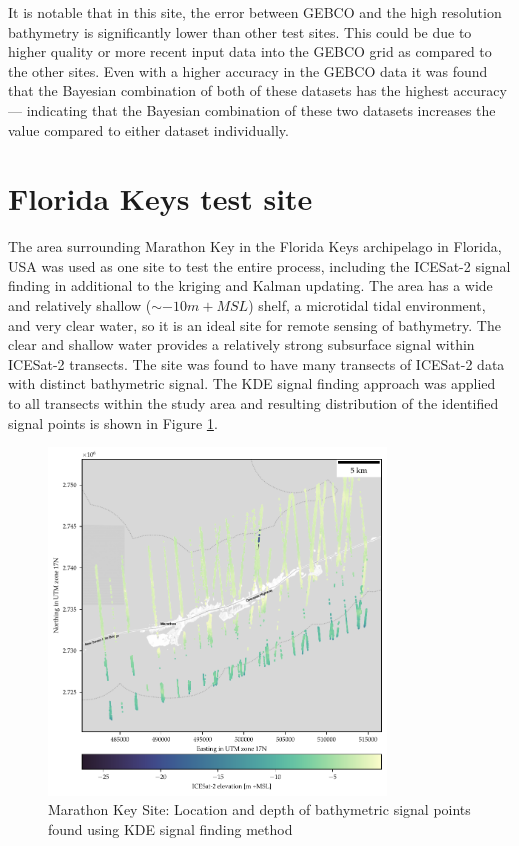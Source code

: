 It is notable that in this site, the error between GEBCO and the high resolution bathymetry is significantly lower than other test sites. This could be due to higher quality or more recent input data into the GEBCO grid as compared to the other sites. 
Even with a higher accuracy in the GEBCO data it was found that the Bayesian combination of both of these datasets has the highest accuracy --- indicating that the Bayesian combination of these two datasets increases the value compared to either dataset individually.




\section{Florida Keys test site}


The area surrounding Marathon Key in the Florida Keys archipelago in Florida, USA was used as one site to test the entire process, including the ICESat-2 signal finding in additional to the kriging and Kalman updating. The area has a wide and relatively shallow ($\sim -10 m +MSL$) shelf, a microtidal tidal environment, and very clear water, so it is an ideal site for remote sensing of bathymetry. The clear and shallow water provides a relatively strong subsurface signal within ICESat-2 transects. The site was found to have many transects of ICESat-2 data with distinct bathymetric signal. The KDE signal finding approach was applied to all transects within the study area and resulting distribution of the identified signal points is shown in Figure \ref{fig:keys-photons}.

\begin{figure}[!ht]
    \centering
    \includegraphics[width=0.8\textwidth]{figures/florida_keys_photon_map.pdf}
    \caption{Marathon Key Site: Location and depth of bathymetric signal points found using KDE signal finding method}
    \label{fig:keys-photons}
\end{figure}

